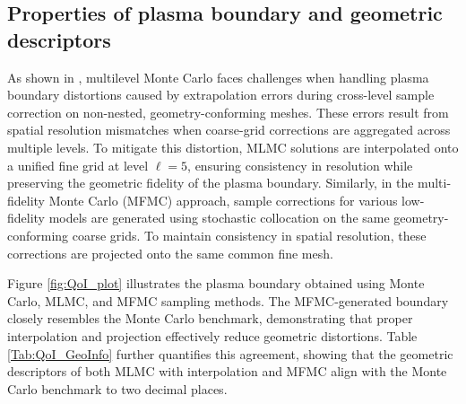 \subsection{Properties of plasma boundary and geometric descriptors}
As shown in \cite{ElLiSa:2023}, multilevel Monte Carlo faces challenges when handling plasma boundary distortions caused by extrapolation errors during cross-level sample correction on non-nested, geometry-conforming meshes. These errors result from spatial resolution mismatches when coarse-grid corrections are aggregated across multiple levels. To mitigate this distortion, MLMC solutions are interpolated onto a unified fine grid at level $\ell=5$, ensuring consistency in resolution while preserving the geometric fidelity of the plasma boundary. Similarly, in the multi-fidelity Monte Carlo (MFMC) approach, sample corrections for various low-fidelity models are generated using stochastic collocation on the same geometry-conforming coarse grids. To maintain consistency in spatial resolution, these corrections are projected onto the same common fine mesh. 

Figure \ref{fig:QoI_plot} illustrates the plasma boundary obtained using Monte Carlo, MLMC, and MFMC sampling methods. The MFMC-generated boundary closely resembles the Monte Carlo benchmark,  demonstrating that proper interpolation and projection effectively reduce geometric distortions. Table \ref{Tab:QoI_GeoInfo} further quantifies this agreement, showing that the geometric descriptors of both MLMC with interpolation and MFMC align with the Monte Carlo benchmark to two decimal places. 









